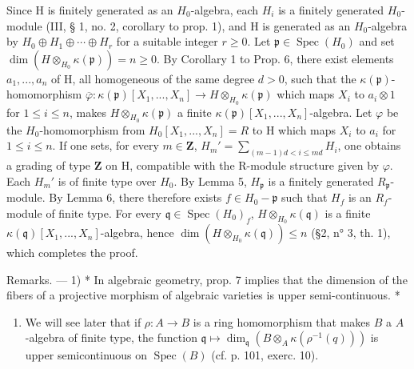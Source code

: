 Since H is finitely generated as an \(H_{0}\)-algebra, each \(H_{i}\) is a finitely generated \(H_{0}\)-module (III, § 1, no. 2, corollary to prop. 1), and H is generated as an \(H_{0}\)-algebra by \(H_{0} \oplus H_{1} \oplus \cdots \oplus H_{r}\) for a suitable integer \(r \geqslant 0\). Let \(\mathfrak{p} \in \operatorname{Spec}(H_{0})\) and set \(\dim(H \otimes_{H_{0}} \kappa(\mathfrak{p})) = n \geqslant 0\). By Corollary 1 to Prop. 6, there exist elements \(a_{1}, ..., a_{n}\) of H, all homogeneous of the same degree \(d > 0\), such that the \(\kappa(\mathfrak{p})\)-homomorphism \(\overline{\varphi}: \kappa(\mathfrak{p})[X_{1}, ..., X_{n}] \to H \otimes_{H_{0}} \kappa(\mathfrak{p})\) which maps \(X_{i}\) to \(a_{i} \otimes 1\) for \(1 \leqslant i \leqslant n\), makes \(H \otimes_{H_{0}} \kappa(\mathfrak{p})\) a finite \(\kappa(\mathfrak{p})[X_{1}, ..., X_{n}]\)-algebra. Let \(\varphi\) be the \(H_{0}\)-homomorphism from \(H_{0}[X_{1}, ..., X_{n}] = R\) to H which maps \(X_{i}\) to \(a_{i}\) for \(1 \leqslant i \leqslant n\). If one sets, for every \(m \in \mathbf{Z}\), \(H_{m}' = \sum_{(m-1)d < i \leqslant md} H_{i}\), one obtains a grading of type \(\mathbf{Z}\) on H, compatible with the R-module structure given by \(\varphi\). Each \(H_{m}'\) is of finite type over \(H_{0}\). By Lemma 5, \(H_{\mathfrak{p}}\) is a finitely generated \(R_{\mathfrak{p}}\)-module. By Lemma 6, there therefore exists \(f \in H_{0} - \mathfrak{p}\) such that \(H_{f}\) is an \(R_{f}\)-module of finite type. For every \(\mathfrak{q} \in \operatorname{Spec}(H_{0})_{f}\), \(H \otimes_{H_{0}} \kappa(\mathfrak{q})\) is a finite \(\kappa(\mathfrak{q})[X_{1}, ..., X_{n}]\)-algebra, hence \(\dim(H \otimes_{H_{0}} \kappa(\mathfrak{q})) \leqslant n\) (\S 2, n° 3, th. 1), which completes the proof.

Remarks. --- 1) * In algebraic geometry, prop. 7 implies that the dimension of the fibers of a projective morphism of algebraic varieties is upper semi-continuous. *

\begin{enumerate}
\def\labelenumi{\arabic{enumi})}
\setcounter{enumi}{1}
\tightlist
\item
  We will see later that if \(\rho:A\to B\) is a ring homomorphism that makes \(B\) a \(A\) -algebra of finite type, the function \(\mathfrak{q}\mapsto\dim_{\mathfrak{q}}(B\otimes_{A}\kappa(\rho^{-1}(q)))\) is upper semicontinuous on \(\operatorname{Spec}(B)\) (cf. p. 101, exerc. 10).
\end{enumerate}

